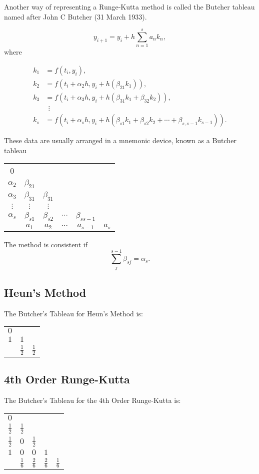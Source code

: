 Another way of representing a Runge-Kutta method is called the Butcher tableau named after John C Butcher (31 March 1933).

\[ y_{i+1}=y_{i}+h\sum _{n=1}^{s}a_{n}k_{n},\] 
where

\[ {\begin{aligned}k_{1}&=f(t_{i},y_{i}),\\k_{2}&=f(t_{i}+\alpha_{2}h,y_{i}+h(\beta_{21}k_{1})),\\k_{3}&=f(t_{i}+\alpha_{3}h,y_{i}+h(\beta_{31}k_{1}+\beta_{32}k_{2})),\\&\ \ \vdots \\k_{s}&=f(t_{i}+\alpha_{s}h,y_{i}+h(\beta_{s1}k_{1}+\beta_{s2}k_{2}+\cdots +\beta_{s,s-1}k_{s-1})).\end{aligned}}\] 

These data are usually arranged in a mnemonic device, known as a Butcher tableau
\begin{center}
 \begin{tabular}{c| c c c c c} 
 0&  &  & & & \\ 
 $\alpha_2$& $\beta_{21}$ &  & & & \\ 
 $\alpha_3$& $\beta_{31}$ & $\beta_{31}$ & & & \\ 
 $\vdots $& $\vdots$ & $\vdots$  & & & \\ 
 
 $\alpha_s$& $\beta_{s1}$ & $\beta_{s2}$ & $\cdots$& $\beta_{ss-1}$ & \\ 
 \hline
 & $a_{1}$  & $a_{2}$ & $\cdots$ &$a_{s-1}$ & $a_s$ \\ 
\end{tabular}
\end{center}
The method is consistent if 
\[\sum_{j}^{s-1} \beta_{sj}=\alpha_s.\]
\subsection{Heun's Method}
The Butcher's Tableau for Heun's Method is:
\begin{center}
 \begin{tabular}{c| c c} 
 $0$&    &   \\ 
 $1$& $1$ &   \\ 
 \hline
 & $\frac{1}{2}$  & $\frac{1}{2}$   \\ 
\end{tabular}
\end{center}
\subsection{4th Order Runge-Kutta}
The Butcher's Tableau for the 4th Order Runge-Kutta is:
\begin{center}
 \begin{tabular}{c| c c c c} 
 $0$&    &  & & \\ 
 $\frac{1}{2}$& $\frac{1}{2}$ &  & & \\ 
 $\frac{1}{2}$& $0$ & $\frac{1}{2}$ & &  \\ 
 $1 $& $0$ & $0$  &$1$ &  \\ 
 \hline
 & $\frac{1}{6}$  & $\frac{2}{6}$ & $\frac{2}{6}$ &$\frac{1}{6}$  \\ 
\end{tabular}
\end{center}

